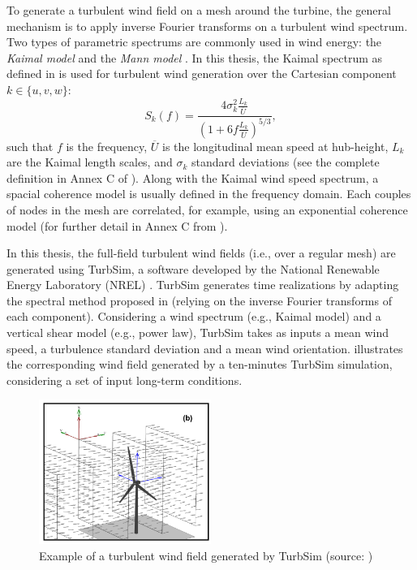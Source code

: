 To generate a turbulent wind field on a mesh around the turbine, the general mechanism is to apply inverse Fourier transforms on a turbulent wind spectrum.  
Two types of parametric spectrums are commonly used in wind energy: the \textit{Kaimal model} \citep{kaimal_1972} and the \textit{Mann model} \citep{mann_1998}. 
In this thesis, the Kaimal spectrum as defined in \cite{iec_2019} is used for turbulent wind generation over the Cartesian component $k \in \{u, v, w\}$:
\begin{equation}
    S_k(f) = \frac{4 \sigma_k^2 \frac{L_k}{\overline{U}}}{\left(1 + 6 f \frac{L_k}{\overline{U}}\right)^{5/3}},
    \label{eq:kaimal}
\end{equation} 
such that $f$ is the frequency, $\overline{U}$ is the longitudinal mean speed at hub-height, $L_k$ are the Kaimal length scales, and $\sigma_k$ standard deviations (see the complete definition in Annex C of \cite{iec_2019}). 
Along with the Kaimal wind speed spectrum, a spacial coherence model is usually defined in the frequency domain. 
Each couples of nodes in the mesh are correlated, for example, using an exponential coherence model (for further detail in Annex C from \cite{iec_2019}).

In this thesis, the full-field turbulent wind fields (i.e., over a regular mesh) are generated using TurbSim, a software developed by the National Renewable Energy Laboratory (NREL) \citep{turbsim_2009}. 
TurbSim generates time realizations by adapting the spectral method proposed in \citet{veers_1988_sandia} (relying on the inverse Fourier transforms of each component).   
Considering a wind spectrum (e.g., Kaimal model) and a vertical shear model (e.g., power law), TurbSim takes as inputs a mean wind speed, a turbulence standard deviation and a mean wind orientation. 
 illustrates the corresponding wind field generated by a ten-minutes TurbSim simulation, considering a set of input long-term conditions. 

\begin{figure}
    \centering
    \includegraphics[width=0.5\textwidth]{./part1/figures/turbsim.png}
    \caption{Example of a turbulent wind field generated by TurbSim (source: \citet{turbsim_2009})}
    \label{fig:turbsim_simu}
\end{figure}

